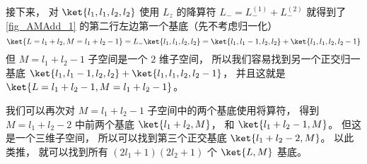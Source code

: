 接下来， 对 $\ket{l_1, l_1, l_2, l_2}$ 使用 $L_z$ 的降算符 $L_- = L_-^{(1)} + L_-^{(2)}$ 就得到了\autoref{fig_AMAdd_1} 的第二行左边第一个基底（先不考虑归一化）
\begin{equation}
\ket{L = l_1 + l_2, M = l_1 + l_2 - 1} = L_- \ket{l_1, l_1, l_2, l_2} = \ket{l_1, l_1 - 1, l_2, l_2} + \ket{l_1, l_1, l_2, l_2 - 1}
\end{equation}
但 $M = l_1 + l_2 - 1$ 子空间是一个 $2$ 维子空间， 所以我们容易找到另一个正交归一基底 $\ket{l_1, l_1 - 1, l_2, l_2} + \ket{l_1, l_1, l_2, l_2 - 1}$， 并且这就是 $\ket{L = l_1 + l_2 - 1, M = l_1 + l_2 - 1}$。

我们可以再次对 $M = l_1 + l_2 - 1$ 子空间中的两个基底使用将算符， 得到 $M = l_1 + l_2 - 2$ 中前两个基底 $\ket{l_1 + l_2, M}$， 和 $\ket{l_1 + l_2 - 1, M}$。 但这是一个三维子空间， 所以可以找到第三个正交基底 $\ket{l_1 + l_2 - 2, M}$。 以此类推， 就可以找到所有 $(2l_1+1)(2l_2+1)$ 个 $\ket{L,M}$ 基底。
